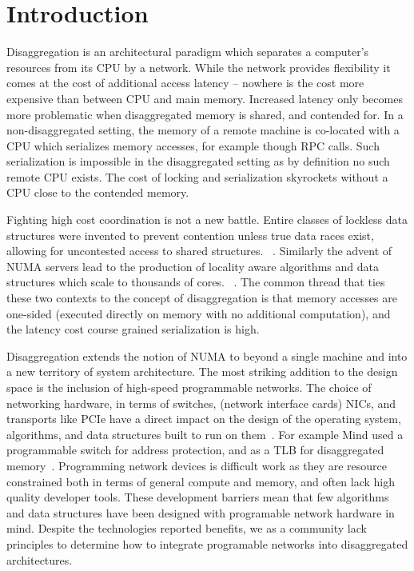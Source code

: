 \section{Introduction}
Disaggregation is an architectural paradigm which separates a computer's
resources from its CPU by a network. While the network provides flexibility it
comes at the cost of additional access latency
-- nowhere is the cost more expensive than between CPU and main memory.
Increased latency only becomes more problematic when disaggregated memory is
shared, and contended for. In a non-disaggregated setting, the memory of a
remote machine is co-located with a CPU which serializes memory accesses, for
example though RPC calls. Such serialization is impossible in the disaggregated
setting as by definition no such remote CPU exists. The cost of locking and
serialization skyrockets without a CPU close to the contended memory.

Fighting high cost coordination is not a new battle. Entire classes of lockless
data structures were invented to prevent contention unless true data races
exist, allowing for uncontested access to shared structures.
~\cite{simple-fast,lock-free-skip,non-block-binary,read-concur-btree,lock-free-btree}.
Similarly the advent of NUMA servers lead to the production of locality aware
algorithms and data structures which scale to thousands of cores.
~\cite{linux-scale,black-box-numa}. The common thread
that ties these two contexts to the concept of disaggregation is that memory
accesses are one-sided (executed directly on memory with no additional
computation), and the latency cost course grained serialization is high.

Disaggregation extends the notion of NUMA to beyond a single machine and into a
new territory of system architecture. The most striking addition to the design
space is the inclusion of high-speed programmable networks. The choice of
networking hardware, in terms of switches, (network interface cards) NICs, and
transports like PCIe have a direct impact on the design of the operating system,
algorithms, and data structures built to run on
them~\cite{dredbox,firebox,machine,legoos,supernic}.  For example Mind used a
programmable switch for address protection, and as a TLB for disaggregated
memory~\cite{mind}.  Programming network devices is difficult work as they are
resource constrained both in terms of general compute and memory, and often lack
high quality developer tools. These development barriers mean that few
algorithms and data structures have been designed with programable network
hardware in mind. Despite the technologies reported benefits, we as a community
lack principles to determine how to integrate programable networks into
disaggregated architectures.

